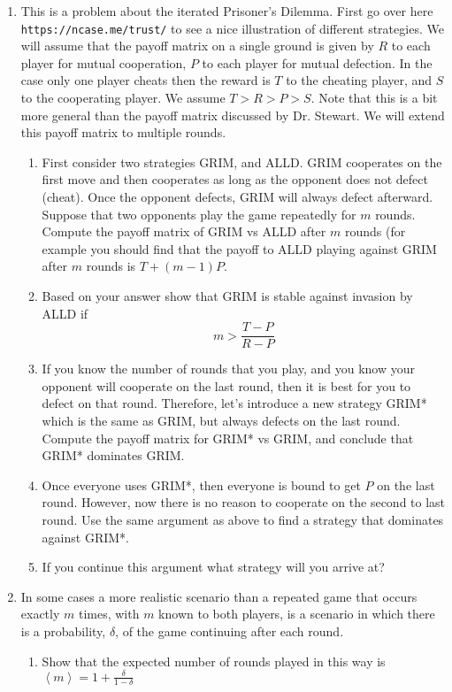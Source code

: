 \documentclass[12pt]{article}
\begin{document}
\begin{enumerate}
\item  This is a problem about the iterated Prisoner's Dilemma.  First go over here \\
\texttt{https://ncase.me/trust/} to see a nice illustration of different strategies.  We will assume
that the payoff matrix on a single ground is given by $R$ to each player for mutual cooperation,
$P$ to each player for mutual defection. In the case only one player cheats then the reward is
$T$ to the cheating player, and $S$ to the cooperating player.   We assume $T > R > P  > S$.  Note that this is a bit more general than the payoff matrix discussed by Dr. Stewart. We will extend this payoff matrix to multiple rounds.
\begin{enumerate}
\item First consider two strategies GRIM, and ALLD.  GRIM cooperates on the first move
and then cooperates as long as the opponent does not defect (cheat).  Once the opponent defects,
GRIM will always defect afterward.  Suppose that two opponents play the game repeatedly for $m$ rounds.
Compute the payoff matrix of GRIM vs ALLD after $m$ rounds (for example you should find that the payoff to ALLD playing 
against GRIM after $m$ rounds is $T + (m-1) P$.
\item Based on your answer show that GRIM is stable against invasion by ALLD if 
$$
m > \frac{T - P}{R-P}
$$
\item If you know the number of rounds that you play, and you know your opponent will cooperate
on the last round, then it is best for you to defect on that round.  Therefore, let's introduce a new strategy
GRIM* which is the same as GRIM, but always defects on the last round. Compute the payoff matrix for
GRIM* vs GRIM, and conclude that GRIM* dominates GRIM.
\item Once everyone uses GRIM*, then everyone is bound to get $P$ on the last round.  However, now
there is no reason to cooperate on the second to last round.  Use the same argument as above to find a strategy
that dominates against GRIM*.  
\item If you continue this argument what strategy will you arrive at?  
\end{enumerate}
\item In some cases a more realistic scenario than a repeated game that occurs exactly $m$ times, with $m$ known to both players, is a scenario in which there is a probability, $\delta$, of the game continuing after each round. 
\begin{enumerate}
\item Show that the expected number of rounds played in this way is $\left<m\right>=1+\frac{\delta}{1-\delta}$

\end{enumerate}
\end{enumerate}
\end{document}
